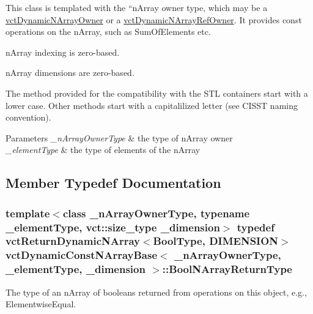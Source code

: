 This class is templated with the ``n\+Array owner type\textquotesingle{}\textquotesingle{}, which may be a \hyperlink{classvct_dynamic_n_array_owner}{vct\+Dynamic\+N\+Array\+Owner} or a \hyperlink{classvct_dynamic_n_array_ref_owner}{vct\+Dynamic\+N\+Array\+Ref\+Owner}. It provides const operations on the n\+Array, such as Sum\+Of\+Elements etc.

n\+Array indexing is zero-\/based.

n\+Array dimensions are zero-\/based.

The method provided for the compatibility with the S\+T\+L containers start with a lower case. Other methods start with a capitalilized letter (see C\+I\+S\+S\+T naming convention).


\begin{DoxyParams}{Parameters}
{\em \+\_\+n\+Array\+Owner\+Type} & the type of n\+Array owner \\
\hline
{\em \+\_\+element\+Type} & the type of elements of the n\+Array \\
\hline
\end{DoxyParams}


\subsection{Member Typedef Documentation}
\hypertarget{classvct_dynamic_const_n_array_base_a983f2b7edd51a896d447383b5a5af289}{}
\subsubsection[{Bool\+N\+Array\+Return\+Type}]{\setlength{\rightskip}{0pt plus 5cm}template$<$class \+\_\+n\+Array\+Owner\+Type, typename \+\_\+element\+Type, vct\+::size\+\_\+type \+\_\+dimension$>$ typedef {\bf vct\+Return\+Dynamic\+N\+Array}$<${\bf Bool\+Type}, {\bf D\+I\+M\+E\+N\+S\+I\+O\+N}$>$ {\bf vct\+Dynamic\+Const\+N\+Array\+Base}$<$ \+\_\+n\+Array\+Owner\+Type, \+\_\+element\+Type, \+\_\+dimension $>$\+::{\bf Bool\+N\+Array\+Return\+Type}}\label{classvct_dynamic_const_n_array_base_a983f2b7edd51a896d447383b5a5af289}
The type of an n\+Array of booleans returned from operations on this object, e.\+g., Elementwise\+Equal. \hypertarget{classvct_dynamic_const_n_array_base_a16bf688936f61d1298ced8f637cfc1f8}{}
